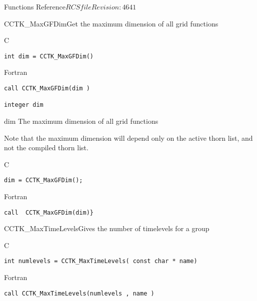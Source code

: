 \begin{cactuspart}{ Functions Reference}{$RCSfile$}{$Revision: 4641 $}
\begin{FunctionDescription}{CCTK\_MaxGFDim}{Get the maximum dimension of all grid
    functions }
\label{CCTK-MaxGFDim}
\begin{SynopsisSection}
\begin{Synopsis}{C}
\begin{verbatim}int dim = CCTK_MaxGFDim()\end{verbatim}
\end{Synopsis}
\begin{Synopsis}{Fortran}
\begin{verbatim}call CCTK_MaxGFDim(dim )

integer dim\end{verbatim}
\end{Synopsis}
\end{SynopsisSection}
\begin{ParameterSection}
\begin{Parameter}{dim}
The maximum dimension of all grid functions
\end{Parameter}
\end{ParameterSection}
\begin{Discussion}
Note that the maximum dimension will depend only on the active thorn list,
and not the compiled thorn list.
\end{Discussion}
\begin{ExampleSection}
\begin{Example}{C}
\begin{verbatim}
dim = CCTK_MaxGFDim();
\end{verbatim}
\end{Example}
\begin{Example}{Fortran}
\begin{verbatim}
call  CCTK_MaxGFDim(dim)}
\end{verbatim}
\end{Example}
\end{ExampleSection}
\end{FunctionDescription}



\begin{FunctionDescription}{CCTK\_MaxTimeLevels}{Gives the number of timelevels for a group}
\label{CCTK-MaxTimeLevels}
\begin{SynopsisSection}
\begin{Synopsis}{C}
\begin{verbatim}int numlevels = CCTK_MaxTimeLevels( const char * name)\end{verbatim}
\end{Synopsis}
\begin{Synopsis}{Fortran}
\begin{verbatim}call CCTK_MaxTimeLevels(numlevels , name )


\end{verbatim}
\end{Synopsis}
\end{SynopsisSection}
\end{FunctionDescription}
\end{cactuspart}
